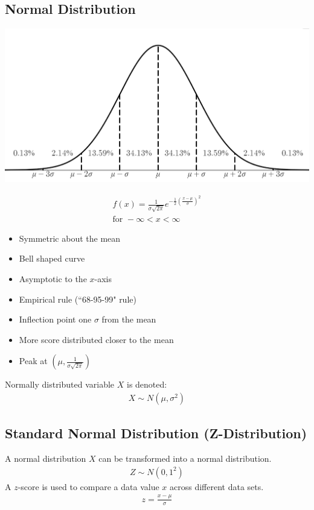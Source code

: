 \documentclass[10pt, a4paper, titlepage]{article}
\begin{document}
\begin{multicols*}{3}
\subsection{Normal Distribution}
\begin{center}
	\includegraphics[width=0.9\linewidth]{normal_distribution.png}\\
\end{center}
\begin{align}
	f(x)=\frac{1}{\sigma \sqrt{2\pi}}e^{-\frac{1}{2}\left(\frac{x-\mu}{\sigma}\right)^2}\\
	\text{for }-\infty <x<\infty
\end{align}
\begin{itemize}
	\item Symmetric about the mean
	\item Bell shaped curve
	\item Asymptotic to the $x$-axis
	\item Empirical rule (``68-95-99" rule)
	\item Inflection point one $\sigma$ from the mean
	\item More score distributed closer to the mean
	\item Peak at $(\mu ,\frac{1}{\sigma \sqrt{2\pi}})$
\end{itemize}
Normally distributed variable $X$ is denoted:
\begin{align}
	X\sim N(\mu ,\sigma ^2)
\end{align}
\dotfill
\subsection{Standard Normal Distribution (Z-Distribution)}
A normal distribution $X$ can be transformed into a normal distribution.
\begin{align}
	Z\sim N(0,1^2)
\end{align}
A $z$-score is used to compare a data value $x$ across different data sets.
\begin{align}
	z=\frac{x-\mu}{\sigma}
\end{align}
\hrulefill

\end{multicols*}
\end{document}
